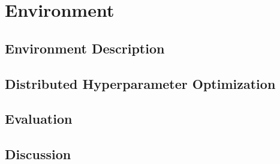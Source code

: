 \chapter{Environment}\label{ch:environment}

\section{Environment Description}

\section{Distributed Hyperparameter Optimization}

\section{Evaluation}

\section{Discussion}